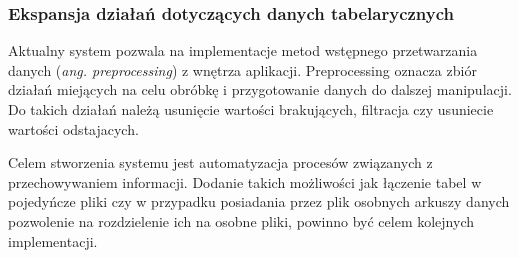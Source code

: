 \documentclass[12pt,a4paper,twoside]{article}
\begin{document}
\subsubsection{Ekspansja działań dotyczących danych tabelarycznych}
Aktualny system pozwala na implementacje metod wstępnego przetwarzania danych (\textit{ang. preprocessing}) z wnętrza aplikacji. Preprocessing oznacza zbiór działań miejących na celu obróbkę i przygotowanie danych do dalszej manipulacji. Do takich działań należą usunięcie wartości brakujących, filtracja czy usuniecie wartości odstajacych. \par
Celem stworzenia systemu jest automatyzacja procesów związanych z przechowywaniem informacji. Dodanie takich możliwości jak łączenie tabel w pojedyńcze pliki czy w przypadku posiadania przez plik osobnych arkuszy danych pozwolenie na rozdzielenie ich na osobne pliki, powinno być celem kolejnych implementacji.
\end{document}
